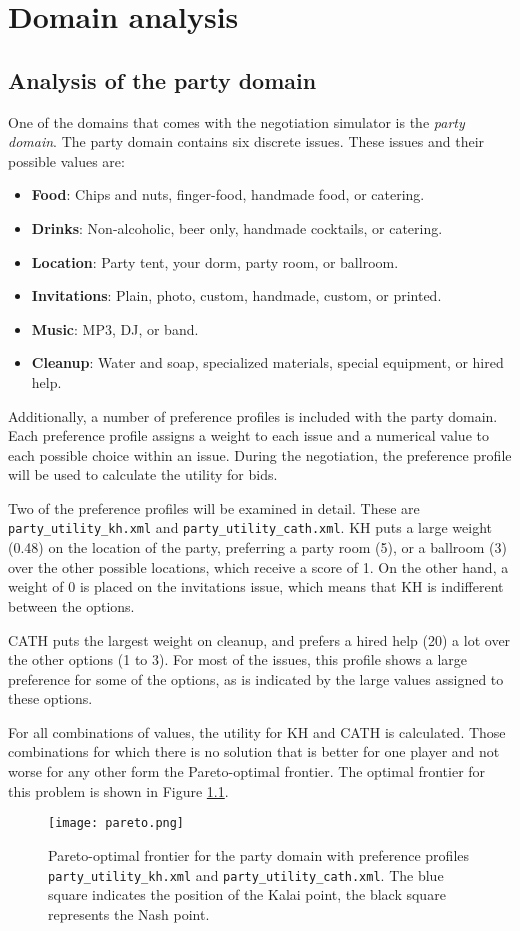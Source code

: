 \chapter{Domain analysis}

\section{Analysis of the party domain}

One of the domains that comes with the negotiation simulator is the \emph{party domain}.
The party domain contains six discrete issues.
These issues and their possible values are:
\begin{itemize}
\item \textbf{Food}: Chips and nuts, finger-food, handmade food, or catering.
\item \textbf{Drinks}: Non-alcoholic, beer only, handmade cocktails, or catering.
\item \textbf{Location}: Party tent, your dorm, party room, or ballroom.
\item \textbf{Invitations}: Plain, photo, custom, handmade, custom, or printed.
\item \textbf{Music}: MP3, DJ, or band.
\item \textbf{Cleanup}: Water and soap, specialized materials, special equipment, or hired help.
\end{itemize}
Additionally, a number of preference profiles is included with the party domain.
Each preference profile assigns a weight to each issue and a numerical value to each possible choice within an issue.
During the negotiation, the preference profile will be used to calculate the utility for bids.

Two of the preference profiles will be examined in detail.
These are \texttt{party\_utility\_kh.xml} and \texttt{party\_utility\_cath.xml}.
KH puts a large weight (0.48) on the location of the party, preferring a party room (5), or a ballroom (3) over the other possible locations, which receive a score of 1.
On the other hand, a weight of 0 is placed on the invitations issue, which means that KH is indifferent between the options.

CATH puts the largest weight on cleanup, and prefers a hired help (20) a lot over the other options (1 to 3).
For most of the issues, this profile shows a large preference for some of the options, as is indicated by the large values assigned to these options.

For all combinations of values, the utility for KH and CATH is calculated.
Those combinations for which there is no solution that is better for one player and not worse for any other form the Pareto-optimal frontier.
The optimal frontier for this problem is shown in Figure \ref{fig:pareto}.
\begin{figure}
\centering
\texttt{[image: pareto.png]}
\caption{Pareto-optimal frontier for the party domain with preference profiles \texttt{party\_utility\_kh.xml} and \texttt{party\_utility\_cath.xml}. The blue square indicates the position of the Kalai point, the black square represents the Nash point.}
\label{fig:pareto}
\end{figure}


